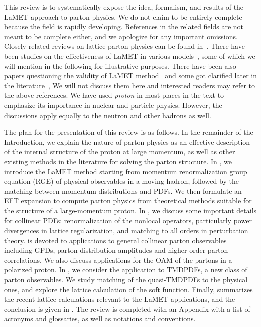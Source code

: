 This review is to systematically expose the idea, formalism, and results
of the LaMET approach to parton physics. We do not claim to be entirely complete
because the field is rapidly developing. References in the related fields
are not meant to be complete either, and we apologize for any important omissions.
Closely-related reviews on lattice parton physics can be found in~\cite{Cichy:2018mum,Zhao:2018fyu}.
There have been studies on the effectiveness of LaMET in various
models~\cite{Ji:2018waw,Gamberg:2014zwa,Broniowski:2017wbr,Xu:2018eii,
	Son:2019ghf,Ma:2019agv,Nam:2017gzm,Bhattacharya:2018zxi,Jia:2015pxx,Hobbs:2017xtq,Broniowski:2017gfp,
	Radyushkin:2017gjd,Bhattacharya:2019cme,Kock:2020frx,DelDebbio:2020cbz},
some of which we will mention in the following for illustrative purposes.
There have been also papers questioning the validity of LaMET method~\cite{Carlson:2017gpk,Rossi:2017muf,Rossi:2018zkn} and some got clarified later in the literature~\cite{Briceno:2017cpo,Ji:2017rah,Radyushkin:2018nbf},
We will not discuss them here and interested readers may refer to the above references.
We have used {\it proton} in most places in the text
to emphasize its importance in nuclear and particle physics. However,
the discussions apply equally to the neutron and other hadrons as well.

The plan for the presentation of this review is as follows. In the remainder of the Introduction, we
explain the nature of parton physics as an effective description
of the internal structure of the proton at large momentum, as well as other existing methods
in the literature for solving the parton structure.
In , we introduce the LaMET method starting from
momentum renormalization group equation (RGE) of physical observables in a moving hadron,
followed by the matching between momentum distributions and PDFs. We then formulate an EFT
expansion to compute parton physics from theoretical methods suitable for the structure of a
large-momentum proton. In , we discuss some important details for
collinear PDFs: renormalization of the nonlocal operators, particularly
power divergences in lattice regularization, and matching to all orders
in perturbation theory.  is devoted to applications to general collinear parton observables
including GPDs, parton distribution amplitudes
and higher-order parton correlations. We also discuss applications
for the OAM of the partons in a polarized proton.
In , we consider the application to
TMDPDFs, a new class of parton observables. We study matching of the quasi-TMDPDFs to the physical ones,
and explore the lattice calculation of the soft function.
Finally,  summarizes the recent lattice calculations relevant to
the LaMET applications, and the conclusion is given in .
The review is completed with an Appendix
with a list of acronyms and glossaries, as well as notations and conventions.

